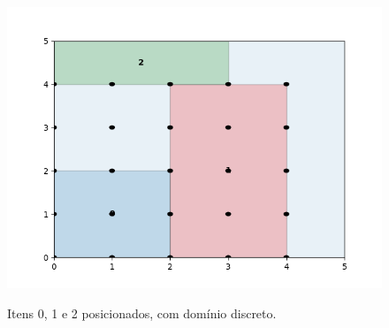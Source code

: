 \begin{figure}[H]
    \centering
    \caption{Itens 0, 1 e 2 posicionados, com domínio discreto.}
    \includegraphics[scale=0.5]{utils/images/discrete_example2}
    \label{fig:sobreposicao-dominio5}
\end{figure}
